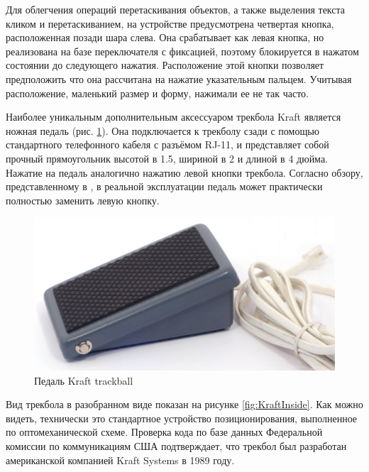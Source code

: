 \documentclass[11pt, a4paper]{article}
\begin{document}
Для облегчения операций перетаскивания объектов, а также выделения текста кликом и перетаскиванием, на устройстве предусмотрена четвертая кнопка, расположенная позади шара слева. Она срабатывает как левая кнопка, но реализована на базе переключателя с фиксацией, поэтому блокируется в нажатом состоянии до следующего нажатия. Расположение этой кнопки позволяет предположить что она рассчитана на нажатие указательным пальцем. Учитывая расположение, маленький размер и форму, нажимали ее не так часто.

Наиболее уникальным дополнительным аксессуаром трекбола Kraft является ножная педаль (рис. \ref{fig:KraftPedal}). Она подключается к трекболу сзади с помощью стандартного телефонного кабеля с разъёмом RJ-11, и представляет собой прочный прямоугольник высотой в 1.5, шириной в 2 и длиной в 4 дюйма. Нажатие на педаль аналогично нажатию левой кнопки трекбола. Согласно обзору, представленному в \cite{kraftwithpedal}, в реальной эксплуатации педаль может практически полностью заменить левую кнопку.

\begin{figure}[h]
    \centering
    \includegraphics[scale=0.4]{1990_kraft_toptrack/pedal_30.jpg}
    \caption{Педаль Kraft trackball}
    \label{fig:KraftPedal}
\end{figure}

Вид трекбола в разобранном виде показан на рисунке \ref{fig:KraftInside}. Как можно видеть, технически это стандартное устройство позиционирования, выполненное по оптомеханической схеме. Проверка кода по базе данных Федеральной комиссии по коммуникациям США подтверждает, что трекбол был разработан американской компанией Kraft Systems в 1989 году.
\end{document}
